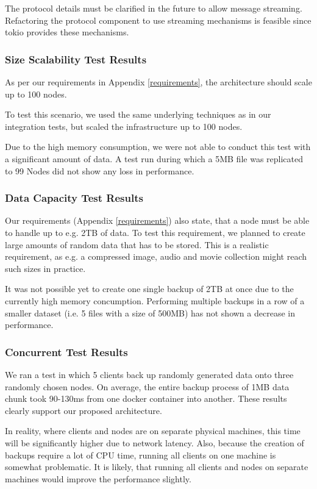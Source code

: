 The protocol details must be clarified in the future to allow message streaming. Refactoring the protocol component to use streaming mechanisms is feasible since tokio provides these mechanisms\cite{tokio-streaming}. 

\subsubsection{Size Scalability Test Results}
As per our requirements in Appendix \ref{requirements}, the architecture should scale up to 100 \glspl{node}.

To test this scenario, we used the same underlying techniques as in our integration tests, but scaled the infrastructure up to 100 \glspl{node}.

Due to the high memory consumption, we were not able to conduct this test with a significant amount of data. A test run during which a 5MB file was replicated to 99 Nodes did not show any loss in performance.

\subsubsection{Data Capacity Test Results}
Our requirements (Appendix \ref{requirements}) also state, that a \gls{node} must be able to handle up to e.g. 2TB of data. To test this requirement, we planned to create large amounts of random data that has to be stored. This is a realistic requirement, as e.g. a compressed image, audio and movie collection might reach such sizes in practice.

It was not possible yet to create one single backup of 2TB at once due to the currently high memory concumption. Performing multiple backups in a row of a smaller dataset (i.e. 5 files with a size of 500MB) has not shown a decrease in performance.

\subsubsection{Concurrent Test Results}

We ran a test in which 5 \glspl{client} back up randomly generated data onto three randomly chosen \glspl{node}. On average, the entire backup process of 1MB data \gls{chunk} took 90-130ms from one docker container into another. These results clearly support our proposed architecture.

In reality, where \glspl{client} and \glspl{node} are on separate physical machines, this time will be significantly higher due to network latency. Also, because the creation of backups require a lot of CPU time, running all \glspl{client} on one machine is somewhat problematic. It is likely, that running all clients and nodes on separate machines would improve the performance slightly.

